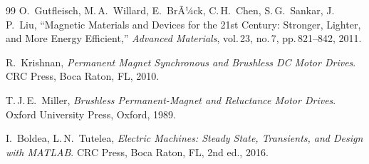 ﻿\documentclass[a4paper,12pt]{article}
\theoremstyle{definition}
\begin{document}
\begin{thebibliography}{99}
O.\ Gutfleisch, M.\,A.\ Willard, E.\ BrÃ¼ck, C.\,H.\ Chen, S.\,G.\ Sankar,
J.\,P.\ Liu,
``Magnetic Materials and Devices for the 21st Century: Stronger, Lighter,
and More Energy Efficient,''
\textit{Advanced Materials}, vol.\,23, no.\,7, pp.\,821--842, 2011.

R.\ Krishnan,
\textit{Permanent Magnet Synchronous and Brushless DC Motor Drives}.
CRC Press, Boca Raton, FL, 2010.

T.\,J.\,E.\ Miller,
\textit{Brushless Permanent-Magnet and Reluctance Motor Drives}.
Oxford University Press, Oxford, 1989.

I.\ Boldea, L.\,N.\ Tutelea,
\textit{Electric Machines: Steady State, Transients, and Design with MATLAB}.
CRC Press, Boca Raton, FL, 2nd ed., 2016.

\end{thebibliography}
\end{document}
